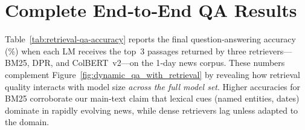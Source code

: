 \documentclass[11pt]{article}
\begin{document}
\begin{table*}[!ht]
\centering
\caption{Top-$k$ Mean Reciprocal Rank (MRR) for different retrieval methods across 1-day, 5-day, and 10-day corpora. Each cell represents the average reciprocal rank of the ground-truth article.}
\label{tab:retrieval-mrr}
\end{table*}

\clearpage

\section{Complete End‑to‑End QA Results}
\label{sec:appendix-model-results_2}


Table~\ref{tab:retrieval-qa-accuracy} reports the final question‑answering
accuracy (\%) when each LM receives the top 3 passages returned by three
retrievers—BM25, DPR, and ColBERT v2—on the 1‑day news corpus.
These numbers complement Figure~\ref{fig:dynamic_qa_with_retrieval} by
revealing how retrieval quality interacts with model size \emph{across the
full model set}.  Higher accuracies for BM25 corroborate our main‑text claim
that lexical cues (named entities, dates) dominate in rapidly evolving news,
while dense retrievers lag unless adapted to the domain.
\end{document}
